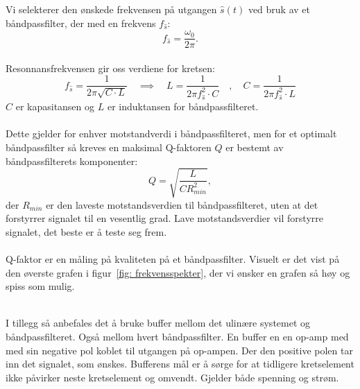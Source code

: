 \documentclass[a4paper,11pt,norsk]{article}
\newcommand{\comma}{\quad , \quad}
\begin{document}
Vi selekterer den ønskede frekvensen på utgangen $\hat{s}(t)$ ved bruk av et båndpassfilter, der med en frekvens $f_{\hat{s}}$:
\begin{equation}
   f_{\hat{s}} = \frac{\omega_0}{2\pi}. 
\end{equation}
\\
Resonnansfrekvensen gir oss verdiene for kretsen: \\
\begin{equation}
    f_{\hat{s}} = \frac{1}{2\pi \sqrt{C\cdot L}} 
    \quad \implies \quad 
    L = \frac{1}{2\pi f_{\hat{s}}^2 \cdot C} 
    \comma 
    C = \frac{1}{2 \pi f_{\hat{s}}^2 \cdot L}
\end{equation}\label{eq: resonnans}
$C$ er kapasitansen og $L$ er induktansen for båndpassfilteret.
\\\\
Dette gjelder for enhver motstandverdi i båndpassfilteret, men for et optimalt båndpassfilter så kreves en maksimal Q-faktoren $Q$ er bestemt av båndpassfilterets komponenter:
\begin{equation}
    Q = \sqrt{\frac{L}{CR_{min}^2}},
    \label{eq:q-faktor}
\end{equation}
der $R_{min}$ er den laveste motstandsverdien til båndpassfilteret, uten at det forstyrrer signalet til en vesentlig grad. Lave motstandsverdier vil forstyrre signalet, det beste er å teste seg frem.
\\
\\
Q-faktor er en måling på kvaliteten på et båndpassfilter. Visuelt er det vist på den øverste grafen i figur~\ref{fig: frekvensspekter}, der vi ønsker en grafen så høy og spiss som mulig. 

\\
I tillegg så anbefales det å bruke buffer mellom det ulinære systemet og båndpassfilteret. Også mellom hvert båndpassfilter. En buffer en en op-amp med med sin negative pol koblet til utgangen på op-ampen. Der den positive polen tar inn det signalet, som ønskes.
Bufferens mål er å sørge for at tidligere kretselement ikke påvirker neste kretselement og omvendt. Gjelder både spenning og strøm.

\newpage
\end{document}
